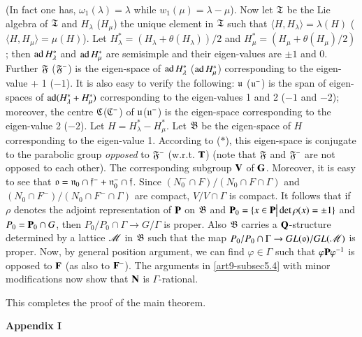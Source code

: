 (In fact one has, $\omega_1 (\lambda) = \lambda$ while $w_1 (\mu) = \lambda - \mu$). Now let $\mathfrak{T}$ be the Lie algebra of $\mathfrak{T}$ and $H_\lambda$ (\resp $H_\mu$) the unique element in $\mathfrak{T}$ such that $\langle H, H_\lambda\rangle  = \lambda (H)$ (\resp $\langle H, H_\mu \rangle = \mu (H)$). Let $H^\ast_\lambda = (H_\lambda + \theta (H_\lambda))/2$ and $H^\ast_\mu = (H_\mu + \theta (H_\mu)/2)$; then $\operatorname{ad} H^\ast_\lambda$ and $\operatorname{ad} H^\ast_\mu$ are semisimple and their eigen-values are $\pm 1$ and 0. Further $\mathfrak{F}$ (\resp $\mathfrak{F}^-$) is the eigen-space of $\operatorname{ad} H^\ast_\lambda$ (\resp $\operatorname{ad} H^\ast_\mu$) corresponding to the eigen-value + 1 (\resp $-1$). It is also easy to verify the following: $\mathfrak{u}$ (\resp $\mathfrak{u}^-$) is the span of eigen-spaces of $\operatorname{ad} (H^\ast_\lambda + H^\ast_\mu)$ corresponding to the eigen-values 1 and 2 (\resp $-1$ and $-2$); moreover, the centre $\mathfrak{C}$(\resp $\mathfrak{C}^-$) of $\mathfrak{u}$(\resp $\mathfrak{u}^-$) is the eigen-space corresponding to the eigen-value 2 (\resp $-2$). Let $H = H^\ast_\lambda - H^\ast_\mu$. Let $\mathfrak{B}$ be the eigen-space of $H$ corresponding to the eigen-value 1. According to ($\ast$), this eigen-space is conjugate to the parabolic group \textit{opposed} to $\mathfrak{F}^-$ (w.r.t. $\mathbf{T}$) (note that $\mathfrak{F}$ and $\mathfrak{F}^-$ are not opposed to each other). The corresponding subgroup $\mathbf{V}$ of $\mathbf{G}$. Moreover, it is easy to see that $\mathfrak{o} = \mathfrak{n}_0 \cap \mathfrak{f}^- + \mathfrak{n}^-_0 \cap \mathfrak{f}$. Since $(N^-_0 \cap F)/(N_0 \cap F \cap \Gamma)$ and $(N_0 \cap F^-)/(N_0 \cap F^- \cap \Gamma)$ are compact, $V/V \cap \Gamma$ is compact. It follows that if $\rho$ denotes the adjoint representation of $\mathbf{P}$ on $\mathfrak{B}$ and $\mathbf{P}_0 = \{x \in \mathbf{P} \big| \det \rho (x) = \pm 1\}$ and $P_0 =\mathbf{P}_0 \cap G$, then $P_0/P_0 \cap \Gamma \to G / \Gamma$ is proper. Also $\mathfrak{B}$ carries a $\mathbf{Q}$-structure determined by a lattice $\mathscr{M}$ in $\mathfrak{B}$ such that the map $P_0/ P_0 \cap \Gamma \to GL (\mathfrak{o})/ GL (\mathscr{M})$ is proper. Now, by general position argument, we can find $\varphi\in \Gamma $ such that $\varphi \mathbf{P} \varphi^{-1}$ is opposed to $\mathbf{F}$ (as also to $\mathbf{F}^-$). The arguments in \ref{art9-subsec5.4} with minor modifications now show that $\mathbf{N}$ is $\Gamma$-rational.

This completes the proof of the main theorem.
 


\appendix

\begin{center}
{\textbf{\Large{Appendix I}}}
\end{center}

\renewcommand{\thesection}{A.\arabic{section}}

